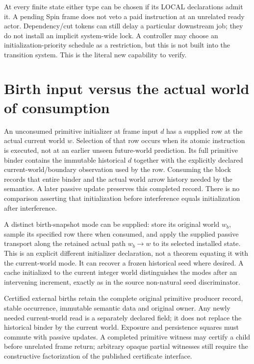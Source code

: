 \documentclass[11pt]{article}\usepackage{amsmath,amssymb,amsthm}
\begin{document}
At every finite state either type can be chosen if its LOCAL declarations admit it. A pending Spin frame does not veto a paid instruction at an unrelated ready actor. Dependency/cut tokens can still delay a particular downstream job; they do not install an implicit system-wide lock. A controller may choose an initialization-priority schedule as a restriction, but this is not built into the transition system. This is the literal new capability to verify.

\section{Birth input versus the actual world of consumption}
An unconsumed primitive initializer at frame input $d$ has a supplied row at the actual current world $w$. Selection of that row occurs when its atomic instruction is executed, not at an earlier unseen future-world prediction. Its full primitive binder contains the immutable historical $d$ together with the explicitly declared current-world/boundary observation used by the row. Consuming the block records that entire binder and the actual world arrow history needed by the semantics. A later passive update preserves this completed record. There is no comparison asserting that initialization before interference equals initialization after interference.

A distinct birth-snapshot mode can be supplied: store its original world $w_b$, sample its specified row there when consumed, and apply the supplied passive transport along the retained actual path $w_b\to w$ to its selected installed state. This is an explicit different initializer declaration, not a theorem equating it with the current-world mode. It can recover a frozen historical seed where desired. A cache initialized to the current integer world distinguishes the modes after an intervening increment, exactly as in the source non-natural seed discriminator.

Certified external births retain the complete original primitive producer record, stable occurrence, immutable semantic data and original owner. Any newly needed current-world read is a separately declared field; it does not replace the historical binder by the current world. Exposure and persistence squares must commute with passive updates. A completed primitive witness may certify a child before unrelated frame return; arbitrary opaque partial witnesses still require the constructive factorization of the published certificate interface.
\end{document}
